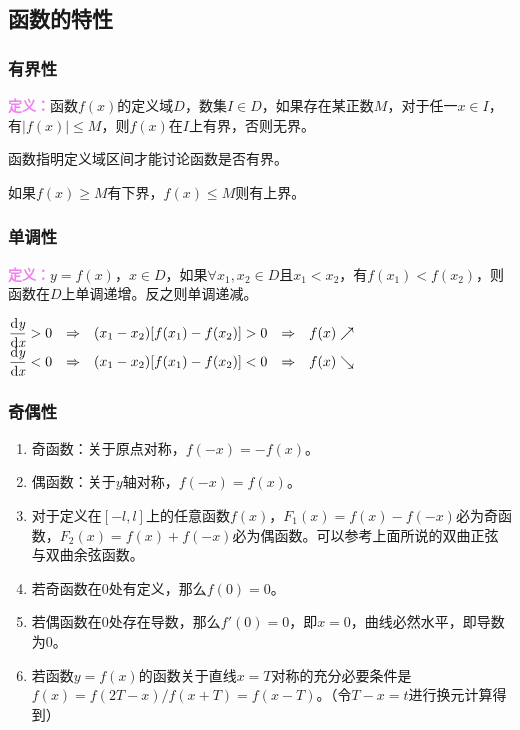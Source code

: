 \documentclass[UTF8, 12pt]{ctexart}
\begin{document}
\subsection{函数的特性}

\subsubsection{有界性}

\textcolor{violet}{\textbf{定义：}}函数$f(x)$的定义域$D$，数集$I\in D$，如果存在某正数$M$，对于任一$x\in I$，有$\vert f(x)\vert\leqslant M$，则$f(x)$在$I$上有界，否则无界。

函数指明定义域区间才能讨论函数是否有界。

如果$f(x)\geqslant M$有下界，$f(x)\leqslant M$则有上界。

\subsubsection{单调性}

\textcolor{violet}{\textbf{定义：}}$y=f(x)$，$x\in D$，如果$\forall x_1,x_2\in D$且$x_1<x_2$，有$f(x_1)<f(x_2)$，则函数在$D$上单调递增。反之则单调递减。

\medskip

$\begin{matrix}
        \dfrac{\rm{d}\textit{y}}{\rm{d}\textit{x}}>0 & \Rightarrow & (x_1-x_2)[f(x_1)-f(x_2)]>0 & \Rightarrow & f(x)\nearrow \\
        \dfrac{\rm{d}\textit{y}}{\rm{d}\textit{x}}<0 & \Rightarrow & (x_1-x_2)[f(x_1)-f(x_2)]<0 & \Rightarrow & f(x)\searrow
    \end{matrix}
$

\subsubsection{奇偶性}

\begin{enumerate}
    \item 奇函数：关于原点对称，$f(-x)=-f(x)$。
    \item 偶函数：关于$y$轴对称，$f(-x)=f(x)$。
    \item 对于定义在$[-l,l]$上的任意函数$f(x)$，$F_1(x)=f(x)-f(-x)$必为奇函数，$F_2(x)=f(x)+f(-x)$必为偶函数。可以参考上面所说的双曲正弦与双曲余弦函数。
    \item 若奇函数在0处有定义，那么$f(0)=0$。
    \item 若偶函数在0处存在导数，那么$f'(0)=0$，即$x=0$，曲线必然水平，即导数为0。
    \item 若函数$y=f(x)$的函数关于直线$x=T$对称的充分必要条件是$f(x)=f(2T-x)/f(x+T)=f(x-T)$。（令$T-x=t$进行换元计算得到）
\end{enumerate}
\end{document}
